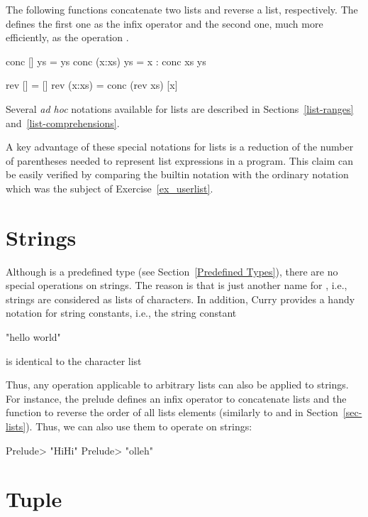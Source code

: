 The following functions concatenate two lists
and reverse a list, respectively.  
The  defines the first one as the infix operator \ccode{++}
and the second one, much more efficiently, as the operation .
%
\begin{curry}
conc []     ys = ys
conc (x:xs) ys = x : conc xs ys

rev []     = []
rev (x:xs) = conc (rev xs) [x]
\end{curry}
%
Several \emph{ad hoc} notations available for lists are 
described in Sections~\ref{list-ranges} and~\ref{list-comprehensions}.

A key advantage of these special notations for lists is
a reduction of the number of parentheses needed to represent
list expressions in a program.
This claim can be easily verified by comparing the builtin
notation with the ordinary notation which was the subject of
Exercise~\ref{ex_userlist}.


\section{Strings}

Although  is a predefined type
(see Section~\ref{Predefined Types}), there are no special
operations on strings. The reason is that 
is just another name for \ccode {[Char]}, i.e., strings
are considered as lists of characters. In addition, Curry
provides a handy notation for string constants, i.e.,
the string constant
%
\begin{curry}
"hello world"
\end{curry}
%
is identical to the character list
%
\begin{curry}
['h','e','l','l','o',' ','w','o','r','l','d']
\end{curry}
%
Thus, any operation applicable to arbitrary lists can also be applied
to strings. For instance, the prelude defines an infix operator
\ccode{++}\pindex{++} to concatenate lists and the function
to reverse the order of all lists elements
(similarly to  and  in
Section~\ref{sec-lists}). Thus, we can also use them to operate on
strings:
%
\begin{prog}
Prelude> 
"HiHi"
Prelude> 
"olleh"
\end{prog}


\section{Tuple}

